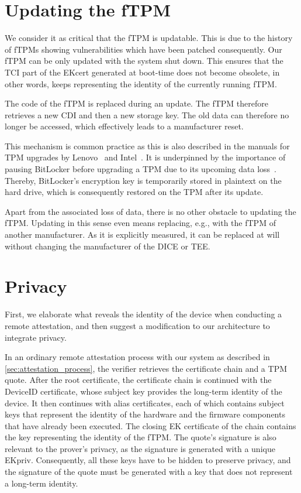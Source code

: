 \section{Updating the fTPM}

We consider it as critical that the \ac{fTPM} is updatable. This is due to the history of \acp{fTPM} showing vulnerabilities which have been patched consequently.
Our \ac{fTPM} can be only updated with the system shut down.
This ensures that the TCI part of the EKcert generated at boot-time does not become obsolete, in other words, keeps representing the identity of the currently running fTPM\@.

The code of the fTPM is replaced during an update.
The fTPM therefore retrieves a new CDI and then a new storage key.
The old data can therefore no longer be accessed, which effectively leads to a manufacturer reset.

This mechanism is common practice as this is also described in the manuals for TPM upgrades by Lenovo~\cite{LenovoTpmUpgrade} and Intel~\cite{intelTpmUpgrade}. 
It is underpinned by the importance of pausing BitLocker before upgrading a TPM due to its upcoming data loss~\cite{BitlockerTpmUpgrade}.
Thereby, BitLocker's encryption key is temporarily stored in plaintext on the hard drive, which is consequently restored on the TPM after its update.

Apart from the associated loss of data, there is no other obstacle to updating the \ac{fTPM}\@.
Updating in this sense even means replacing, e.g., with the fTPM of another manufacturer.
As it is explicitly measured, it can be replaced at will without changing the manufacturer of the \ac{DICE} or \ac{TEE}\@.

\section{Privacy}\label{sec:privacy}

First, we elaborate what reveals the identity of the device when conducting a remote attestation, and then suggest a modification to our architecture to integrate privacy.

In an ordinary remote attestation process with our system as described in \autoref{sec:attestation_process}, the verifier retrieves the certificate chain and a TPM quote.
After the root certificate, the certificate chain is continued with the DeviceID certificate, whose subject key provides the long-term identity of the device.
It then continues with alias certificates, each of which contains subject keys that represent the identity of the hardware and the firmware components that have already been executed.
The closing EK certificate of the chain contains the key representing the identity of the fTPM\@.
The quote's signature is also relevant to the prover's privacy, as the signature is generated with a unique EKpriv.
Consequently, all these keys have to be hidden to preserve privacy, and the signature of the quote must be generated with a key that does not represent a long-term identity.

